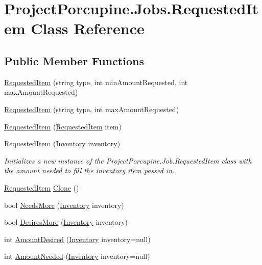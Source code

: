 \hypertarget{class_project_porcupine_1_1_jobs_1_1_requested_item}{}\section{Project\+Porcupine.\+Jobs.\+Requested\+Item Class Reference}
\label{class_project_porcupine_1_1_jobs_1_1_requested_item}
\subsection*{Public Member Functions}
\begin{DoxyCompactItemize}
\item 
\hyperlink{class_project_porcupine_1_1_jobs_1_1_requested_item_a2449ad734128bb370678af6f0097cf53}{Requested\+Item} (string type, int min\+Amount\+Requested, int max\+Amount\+Requested)
\item 
\hyperlink{class_project_porcupine_1_1_jobs_1_1_requested_item_a3ff465f2481ca2a696e5ad2cd6c410f7}{Requested\+Item} (string type, int max\+Amount\+Requested)
\item 
\hyperlink{class_project_porcupine_1_1_jobs_1_1_requested_item_a4d700146c3d3998b68763142f89d6ab2}{Requested\+Item} (\hyperlink{class_project_porcupine_1_1_jobs_1_1_requested_item}{Requested\+Item} item)
\item 
\hyperlink{class_project_porcupine_1_1_jobs_1_1_requested_item_a38228f96b2d55fb0e2bc120ad9f6a4fb}{Requested\+Item} (\hyperlink{class_inventory}{Inventory} inventory)
\begin{DoxyCompactList}\small\item\em Initializes a new instance of the Project\+Porcupine.\+Job.\+Requested\+Item class with the amount needed to fill the inventory item passed in. \end{DoxyCompactList}\item 
\hyperlink{class_project_porcupine_1_1_jobs_1_1_requested_item}{Requested\+Item} \hyperlink{class_project_porcupine_1_1_jobs_1_1_requested_item_ac8826dad39d9afe033ab1c42fea73dba}{Clone} ()
\item 
bool \hyperlink{class_project_porcupine_1_1_jobs_1_1_requested_item_a61bfe58296b188bd8a6228bc5139285e}{Needs\+More} (\hyperlink{class_inventory}{Inventory} inventory)
\item 
bool \hyperlink{class_project_porcupine_1_1_jobs_1_1_requested_item_a1d6d0758230eba72666d0c50bb5ab6a9}{Desires\+More} (\hyperlink{class_inventory}{Inventory} inventory)
\item 
int \hyperlink{class_project_porcupine_1_1_jobs_1_1_requested_item_a71d5c8e133ad4bccb7d0c68ed44fc317}{Amount\+Desired} (\hyperlink{class_inventory}{Inventory} inventory=null)
\item 
int \hyperlink{class_project_porcupine_1_1_jobs_1_1_requested_item_a7ec5d44f9d26463d6f417e27172c063d}{Amount\+Needed} (\hyperlink{class_inventory}{Inventory} inventory=null)
\end{DoxyCompactItemize}

